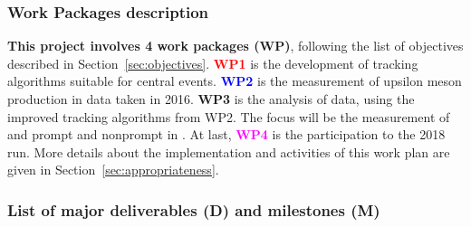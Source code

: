 \documentclass[a4paper,11pt]{article}
\begin{document}
\subsubsection*{Work Packages description}

\textbf{This project involves 4 work packages (WP)}, following the list of objectives described in Section~\ref{sec:objectives}. \textbf{\textcolor{red}{WP1}} is the development of tracking algorithms suitable for central events. \textbf{\textcolor{blue}{WP2}} is the measurement of upsilon meson production in \pPb data taken in 2016. \textbf{\textcolor{green!50!black}{WP3}} is the analysis of \pbpb data, using the improved tracking algorithms from WP2. The focus will be the measurement of \Dz and prompt and nonprompt \Jpsi in \pbpb. At last, \textbf{\textcolor{magenta}{WP4}} is the participation to the 2018 \PbPb run. More details about the implementation and activities of this work plan are given in Section~\ref{sec:appropriateness}.


\subsubsection*{List of major deliverables (D) and milestones (M)}
\end{document}
